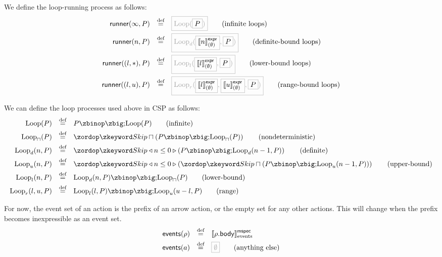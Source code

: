 \begin{definition}
We define the loop-running process as follows:
%
\begin{align*}
  \funcname{runner}(\infty, P)
  \quad\defeq\quad
  & \tlang{\iloop{\olang{P}}}
    \tag{infinite loops}
  \\
  \funcname{runner}(n, P)
  \quad\defeq\quad
  & \tlang{\dloop{\olang{\exprsema{n}{\emptyset}}}{\olang{P}}}
    \tag{definite-bound loops}
  \\
  \funcname{runner}((l, \ast), P)
  \quad\defeq\quad
  & \tlang{\lloop{\olang{\exprsema{l}{\emptyset}}}{\olang{P}}}
    \tag{lower-bound loops}
  \\
  \funcname{runner}((l, u), P)
  \quad\defeq\quad
  & \tlang{\rloop{\olang{\exprsema{l}{\emptyset}}}{\olang{\exprsema{u}{\emptyset}}}{\olang{P}}}
    \tag{range-bound loops}
  \\  
\end{align*}

\end{definition}

\begin{definition}

We can define the loop processes used above in CSP as follows:
%
\begin{align*}
  \iloop{P}
  \quad\defeq\quad
  & P \circseq \iloop{P}
    \tag{infinite}
  \\
  \nloop{P}
  \quad\defeq\quad
  & \Skip \sqcap \left(P \circseq \nloop{P}\right)
    \tag{nondeterministic}
  \\  
  \dloop{n}{P}
  \quad\defeq\quad
  & \Skip \triangleleft n \leq 0 \triangleright \left(P \circseq \dloop{n-1}{P}\right)
    \tag{definite}
  \\
  \uloop{n}{P}
  \quad\defeq\quad
  & \Skip \triangleleft n \leq 0 \triangleright \left(\Skip \sqcap \left(P \circseq \uloop{n-1}{P}\right)\right)
    \tag{upper-bound}
  \\
  \lloop{n}{P}
  \quad\defeq\quad
  & \dloop{n}{P} \circseq \nloop{P}
    \tag{lower-bound}
  \\
  \rloop{l}{u}{P}
  \quad\defeq\quad
  & \lloop{l}{P} \circseq \uloop{u - l}{P}
    \tag{range}
  \\
\end{align*}
\end{definition}

\begin{definition}
For now, the event set of an action is the prefix of an arrow action, or
the empty set for any other actions.  This will change when the prefix becomes
inexpressible as an event set.
%
\begin{align*}
  \eventsOf{\anarrow}
  \quad\defeq\quad
  &
  \emspecsema{\field{\anarrow}{body}}
\\
	\eventsOf{\anaction}
\quad\defeq\quad&
	\tlang{\emptyset}
	\tag{anything else}
\end{align*}
\end{definition}

